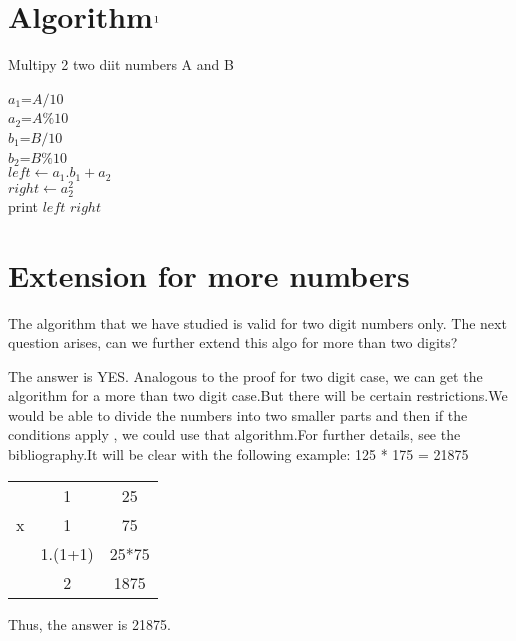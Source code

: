 \documentclass{article}
\begin{document}
\section{Algorithm$\footnote{\label{IMPORTANT NOTE}Note that this algorithm is fast only for these two cases.For other cases,refer the bibliography}$}
    \begin{algorithm}[]
        \caption{Multipy 2 two diit numbers A and B}
       $a_{1} $=$ A/10$\\
       $a_{2} $=$ A \% 10$ \\
       $b_{1} $=$ B/10$\\
       $b_{2} $=$ B \% 10$\\
        {
            $left \gets a_{1}.b_{1} + a_{2}$\\
            $right \gets a_{2}^2$\\
            print $left$ $right$
        }
        
    \end{algorithm}
\section{Extension for more numbers}
    The algorithm that we have studied is valid for two digit numbers only. The next question arises, can we further extend this algo for more than two digits?\par
    The answer is YES. Analogous to the proof for two digit case, we can get the algorithm for a more than two digit case.But there will be certain restrictions.We would be able to divide the numbers into two smaller parts and then if the conditions apply , we could use that algorithm.For further details, see the bibliography.It will be clear with the following example: 125 * 175 = 21875\\
    \begin{center}
        \begin{tabular}{c c c}
              &1 & 25  \\
             x&1 & 75  \\
             \hline
             &1.(1+1) & 25*75\\
             &2 &1875
             
        \end{tabular}
    \end{center}
    Thus, the answer is 21875.\\
    
\end{document}
